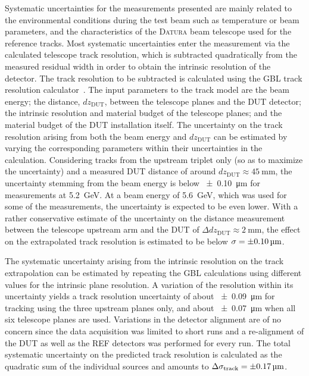 \documentclass[a4paper,11pt]{article}
\newcommand{\datura}{\textsc{Datura}\xspace}
\begin{document}
Systematic uncertainties for the measurements presented are mainly related to the environmental conditions during the test beam such as temperature or beam parameters, and the characteristics of the \datura beam telescope used for the reference tracks.
Most systematic uncertainties enter the measurement via the calculated telescope track resolution, which is subtracted quadratically from the measured residual width in order to obtain the intrinsic resolution of the detector.
The track resolution to be subtracted is calculated using the GBL track resolution calculator~\cite{gbltool}.
The input parameters to the track model are the beam energy; the distance, $dz_{\mathrm{DUT}}$, between the telescope planes and the DUT detector; the intrinsic resolution and material budget of the telescope planes; and the material budget of the DUT installation itself.
The uncertainty on the track resolution arising from both the beam energy and $dz_{\mathrm{DUT}}$ can be estimated by varying the corresponding parameters within their uncertainties in the calculation.
Considering tracks from the upstream triplet only (so as to maximize the uncertainty) and a measured DUT distance of around $dz_{\mathrm{DUT}} \approx \SI{45}{\milli\meter}$, the uncertainty stemming from the beam energy is below \SI{\pm0.10}{\micro\meter} for measurements at \SI{5.2}{\GeV}.
At a beam energy of \SI{5.6}{\GeV}, which was used for some of the measurements, the uncertainty is expected to be even lower.
With a rather conservative estimate of the uncertainty on the distance measurement between the telescope upstream arm and the DUT of $\Delta dz_{\mathrm{DUT}} \approx \SI{2}{\milli\meter}$, the effect on the extrapolated track resolution is estimated to be below $\sigma = \SI{\pm0.10}{\micro\meter}$.

The systematic uncertainty arising from the intrinsic resolution on the track extrapolation can be estimated by repeating the GBL calculations using different values for the intrinsic plane resolution.
A variation of the resolution within its uncertainty yields a track resolution uncertainty of about \SI{\pm0.09}{\micro\meter} for tracking using the three upstream planes only, and about \SI{\pm0.07}{\micro\meter} when all six telescope planes are used.
Variations in the detector alignment are of no concern since the data acquisition was limited to short runs and a re-alignment of the DUT as well as the REF detectors was performed for every run.
The total systematic uncertainty on the predicted track resolution is calculated as the quadratic sum of the individual sources and amounts to $\Delta \sigma_{\mathrm{track}} = \SI{\pm0.17}{\micro\meter}$.
\end{document}
